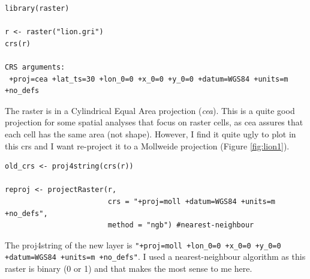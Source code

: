 \documentclass{book}
\begin{document}
\begin{lstlisting}
library(raster)

r <- raster("lion.gri")
crs(r)

CRS arguments:
 +proj=cea +lat_ts=30 +lon_0=0 +x_0=0 +y_0=0 +datum=WGS84 +units=m
+no_defs 
\end{lstlisting}

The raster is in a Cylindrical Equal Area projection (\textit{cea}).
This is a quite good projection for some spatial analyses that focus on raster cells, as cea assures that each cell has the same area (not shape).
However, I find it quite ugly to plot in this crs and I want re-project it to a Mollweide projection (Figure \ref{fig:lion1}).

\begin{lstlisting}
old_crs <- proj4string(crs(r))

reproj <- projectRaster(r,
                        crs = "+proj=moll +datum=WGS84 +units=m +no_defs",
                        method = "ngb") #nearest-neighbour

\end{lstlisting}
The proj4string of the new layer is \texttt{"+proj=moll +lon\_0=0 +x\_0=0 +y\_0=0 +datum=WGS84 +units=m +no\_defs"}.
I used a nearest-neighbour algorithm as this raster is binary (0 or 1) and that makes the most sense to me here.
\end{document}

